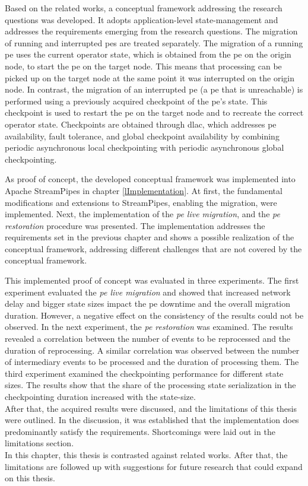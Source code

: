Based on the related works, a conceptual framework addressing the research questions was developed. It adopts application-level state-management and addresses the requirements emerging from the research questions. The migration of running and interrupted \gls{pe}s are treated separately. The migration of a running \gls{pe} uses the current operator state, which is obtained from the \gls{pe} on the origin node, to start the \gls{pe} on the target node. This means that processing can be picked up on the target node at the same point it was interrupted on the origin node. In contrast, the migration of an interrupted \gls{pe} (a \gls{pe} that is unreachable) is performed using a previously acquired checkpoint of the \gls{pe}'s state. This checkpoint is used to restart the \gls{pe} on the target node and to recreate the correct operator state. Checkpoints are obtained through \gls{dlac}, which addresses \gls{pe} availability, fault tolerance, and global checkpoint availability by combining periodic asynchronous local checkpointing with periodic asynchronous global checkpointing.\par

As proof of concept, the developed conceptual framework was implemented into Apache StreamPipes in chapter \ref{lImplementation}. At first, the fundamental modifications and extensions to StreamPipes, enabling the migration, were implemented. Next, the implementation of the \textit{\acrshort{pe} live migration}, and the \textit{\acrshort{pe} restoration} procedure was presented. The implementation addresses the requirements set in the previous chapter and shows a possible realization of the conceptual framework, addressing different challenges that are not covered by the conceptual framework.\par

This implemented proof of concept was evaluated in three experiments. The first experiment evaluated the \textit{\acrshort{pe} live migration} and showed that increased network delay and bigger state sizes impact the \gls{pe} downtime and the overall migration duration. However, a negative effect on the consistency of the results could not be observed. In the next experiment, the \textit{\acrshort{pe} restoration} was examined. The results revealed a correlation between the number of events to be reprocessed and the duration of reprocessing. A similar correlation was observed between the number of intermediary events to be processed and the duration of processing them. The third experiment examined the checkpointing performance for different state sizes. The results show that the share of the processing state serialization in the checkpointing duration increased with the state-size.\\
After that, the acquired results were discussed, and the limitations of this thesis were outlined. In the discussion, it was established that the implementation does predominantly satisfy the requirements. Shortcomings were laid out in the limitations section.\\
In this chapter, this thesis is contrasted against related works. After that, the limitations are followed up with suggestions for future research that could expand on this thesis.\par


